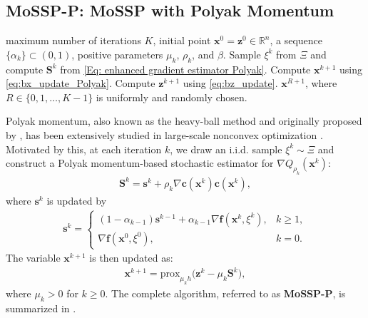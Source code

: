 \documentclass{article}
\theoremstyle{plain}
\theoremstyle{definition}
\theoremstyle{remark}
\newcommand{\RR}{\mathbb{R}}
\newcommand{\prox}{\mathrm{prox}}
\newcommand{\bx}{\bm{x}}
\newcommand{\bc}{\bm{c}}
\newcommand{\bz}{\bm{z}}
\newcommand{\bS}{\bm{S}}
\newcommand{\bs}{\bm{s}}
\newcommand{\tf}{\mathbf{f}}
\numberwithin{equation}{section}
\begin{document}
\subsection{MoSSP-P: MoSSP with Polyak Momentum}
\label{Subsection: Polyak-momentum based algorithm and its main complexity results}
\begin{algorithm}[t]
    \caption{\textbf{MoSSP-P}: \textbf{S}ingle-Loop \textbf{S}tochastic \textbf{P}enalty Algorithm with \textbf{P}olyak \textbf{Mo}mentum}
    \label{alg:mossp-p}
    \begin{algorithmic}
         maximum number of iterations $K$, initial point $\bx^{0} = \bz^{0} \in \RR^{n}$, a sequence $\{\alpha_k\}\subset(0,1)$, positive parameters $\mu_k$, $\rho_k$, and $\beta$.
        \STATE Sample $\xi^k$ from $\Xi$ and compute $\bS^{k}$ from \eqref{Eq: enhanced gradient estimator Polyak}.
        \STATE Compute $\bx^{k+1}$ using \eqref{eq:bx_update_Polyak}.
        \STATE Compute $\bz^{k+1}$ using \eqref{eq:bz_update}.
        \ENDFOR
         $\bx^{R+1}$, where $R \in \{0,1,\ldots,K-1\}$ is uniformly and randomly chosen.
    \end{algorithmic}
\end{algorithm}

Polyak momentum, also known as the heavy-ball method and originally proposed by \citet{polyak1964some}, has been extensively studied in large-scale nonconvex optimization \cite{liu2020,jelassi2022,gao2024non}. Motivated by this, at each iteration $k$, we draw an i.i.d. sample $\xi^k \sim \Xi$ and construct a Polyak momentum-based stochastic estimator for $\nabla Q_{\rho_k}(\bx^k)$:
\begin{align}
\label{Eq: enhanced gradient estimator Polyak}
\bS^{k} = \bs^k + \rho_k \nabla \bc(\bx^{k}) \bc(\bx^{k}),
\end{align}
where $\bs^k$ is updated by
\begin{align}
\bs^{k} = \begin{cases} (1 - \alpha_{k-1}) \bs^{k-1} + \alpha_{k-1} \nabla \tf(\bx^k, \xi^k), & k \ge 1, \\ \nabla \tf(\bx^0, \xi^0), & k=0. \end{cases}
\end{align}
The variable $\bx^{k+1}$ is then updated as:
\begin{align}
\bx^{k+1} = 
\prox_{\mu_k h}\bigl(\bz^k - \mu_k \bS^{k}\bigr), \label{eq:bx_update_Polyak}
\end{align}
where $\mu_k > 0$ for $k \geq 0$. The complete algorithm, referred to as \textbf{MoSSP-P}, is summarized in .
\end{document}

